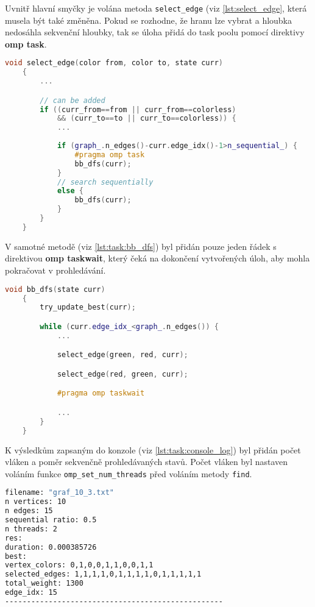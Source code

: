 Uvnitř hlavní smyčky je volána metoda \texttt{select\_edge} (viz \ref{lst:select_edge}, která musela být také změněna.
Pokud se rozhodne, že hranu lze vybrat a hloubka nedosáhla sekvenční hloubky, tak se úloha přidá do task poolu pomocí direktivy \textbf{omp task}.

\begin{lstlisting}[language=C++, label={lst:select_edge}, title={Metoda pro označení hrany}]
    void select_edge(color from, color to, state curr)
    {
        ...

        // can be added
        if ((curr_from==from || curr_from==colorless)
            && (curr_to==to || curr_to==colorless)) {
            ...
            
            if (graph_.n_edges()-curr.edge_idx()-1>n_sequential_) {
                #pragma omp task
                bb_dfs(curr);
            }
            // search sequentially
            else {
                bb_dfs(curr);
            }
        }
    }
\end{lstlisting}

V samotné metodě (viz \ref{lst:task:bb_dfs}) byl přidán pouze jeden řádek s direktivou \textbf{omp taskwait}, který čeká na dokončení vytvořených úloh, aby mohla pokračovat v prohledávání.

\begin{lstlisting}[language=C++, label={lst:task:bb_dfs}, title={Metoda pro prohledávání stavového prostoru}]
    void bb_dfs(state curr)
    {
        try_update_best(curr);

        while (curr.edge_idx_<graph_.n_edges()) {
            ...

            select_edge(green, red, curr);

            select_edge(red, green, curr);

            #pragma omp taskwait

            ...
        }
    }
\end{lstlisting}

K výsledkům zapsaným do konzole (viz \ref{lst:task:console_log}) byl přidán počet vláken a poměr sekvenčně prohledávaných stavů.
Počet vláken byl nastaven voláním funkce \texttt{omp\_set\_num\_threads} před voláním metody \texttt{find}.

\begin{lstlisting}[language=bash, label={lst:task:console_log}, title={Příklad výpisu výsledků}]
filename: "graf_10_3.txt"
n vertices: 10
n edges: 15
sequential ratio: 0.5
n threads: 2
res:
duration: 0.000385726
best:
vertex_colors: 0,1,0,0,1,1,0,0,1,1
selected_edges: 1,1,1,1,0,1,1,1,1,0,1,1,1,1,1
total_weight: 1300
edge_idx: 15
--------------------------------------------------
\end{lstlisting}